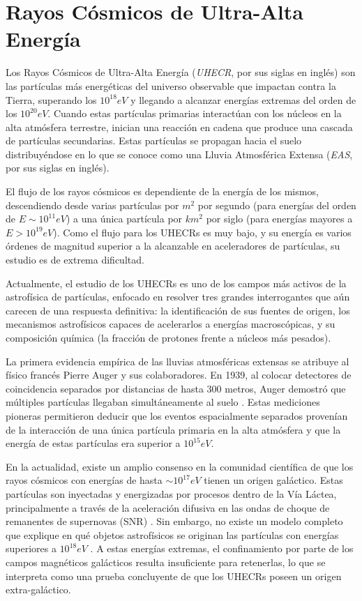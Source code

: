 
\chapter{Rayos Cósmicos de Ultra-Alta Energía}
\label{sec:introduccion}

Los Rayos Cósmicos de Ultra-Alta Energía (\textit{UHECR}, por sus siglas en inglés) son las partículas más energéticas del universo observable que impactan contra la Tierra, superando los $10^{18}eV$ y llegando a alcanzar energías extremas del orden de los $10^{20}eV$. Cuando estas partículas primarias interactúan con los núcleos en la alta atmósfera terrestre, inician una reacción en cadena que produce una cascada de partículas secundarias. Estas partículas se propagan hacia el suelo distribuyéndose en lo que se conoce como una Lluvia Atmosférica Extensa (\textit{EAS}, por sus siglas en inglés). 

El flujo de los rayos cósmicos es dependiente de la energía de los mismos, descendiendo desde varias partículas por $m^2$ por segundo (para energías del orden de $E \sim 10^{11}eV$) a una única partícula por $km^2$ por siglo (para energías mayores a $E > 10^{19}eV$). Como el flujo para los UHECRs es muy bajo, y su energía es varios órdenes de magnitud superior a la alcanzable en aceleradores de partículas, su estudio es de extrema dificultad.

Actualmente, el estudio de los UHECRs es uno de los campos más activos de la astrofísica de partículas, enfocado en resolver tres grandes interrogantes que aún carecen de una respuesta definitiva: la identificación de sus fuentes de origen, los mecanismos astrofísicos capaces de acelerarlos a energías macroscópicas, y su composición química (la fracción de protones frente a núcleos más pesados).

La primera evidencia empírica de las lluvias atmosféricas extensas se atribuye al físico francés Pierre Auger y sus colaboradores. En 1939, al colocar detectores de coincidencia separados por distancias de hasta 300 metros, Auger demostró que múltiples partículas llegaban simultáneamente al suelo \cite{auger1939}. Estas mediciones pioneras permitieron deducir que los eventos espacialmente separados provenían de la interacción de una única partícula primaria en la alta atmósfera y que la energía de estas partículas era superior a $10^{15}eV$.

En la actualidad, existe un amplio consenso en la comunidad científica de que los rayos cósmicos con energías de hasta $\sim 10^{17}eV$ tienen un origen galáctico. Estas partículas son inyectadas y energizadas por procesos dentro de la Vía Láctea, principalmente a través de la aceleración difusiva en las ondas de choque de remanentes de supernovas (SNR) \cite{blasi2013}. Sin embargo, no existe un modelo completo que explique en qué objetos astrofísicos se originan las partículas con energías superiores a $10^{18}eV$ \cite{aloisio2017}. A estas energías extremas, el confinamiento por parte de los campos magnéticos galácticos resulta insuficiente para retenerlas, lo que se interpreta como una prueba concluyente de que los UHECRs poseen un origen extra-galáctico. 


